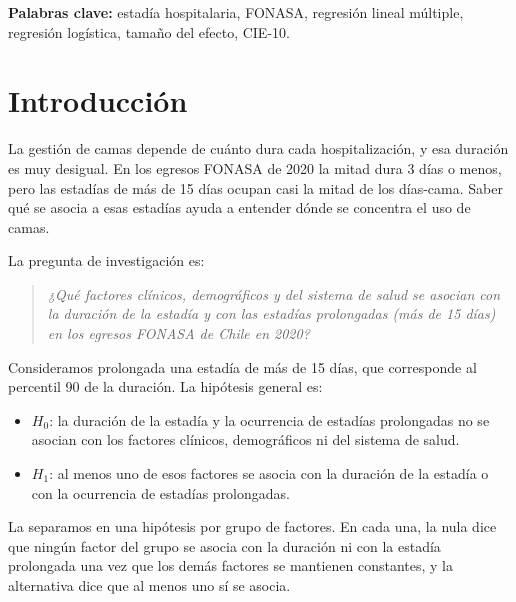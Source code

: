 \documentclass[10.5pt,a4paper,headings=small,abstract=false,bibliography=totoc,listof=totoc]{scrartcl}
\newcommand{\cie}{\mbox{CIE-10}}
\begin{document}
\vspace{0.4em}
{\small\color{gris}\textbf{Palabras clave:} estadía hospitalaria, FONASA, regresión lineal múltiple, regresión logística, tamaño del efecto, \cie.\par}

\clearpage
\tableofcontents
\vspace{1.2em}
\listoftables
\vspace{1.2em}
\listoffigures

\clearpage
{}

\section{Introducción}

La gestión de camas depende de cuánto dura cada hospitalización, y esa duración es muy desigual. En los egresos FONASA de 2020 la mitad dura 3 días o menos, pero las estadías de más de 15 días ocupan casi la mitad de los días-cama. Saber qué se asocia a esas estadías ayuda a entender dónde se concentra el uso de camas.

La pregunta de investigación es:

\begin{quote}
\emph{¿Qué factores clínicos, demográficos y del sistema de salud se asocian con la duración de la estadía y con las estadías prolongadas (más de 15 días) en los egresos FONASA de Chile en 2020?}
\end{quote}

Consideramos prolongada una estadía de más de 15 días, que corresponde al percentil 90 de la duración. La hipótesis general es:

\begin{itemize}\setlength\itemsep{0pt}
\item $H_0$: la duración de la estadía y la ocurrencia de estadías prolongadas no se asocian con los factores clínicos, demográficos ni del sistema de salud.
\item $H_1$: al menos uno de esos factores se asocia con la duración de la estadía o con la ocurrencia de estadías prolongadas.
\end{itemize}

La separamos en una hipótesis por grupo de factores. En cada una, la nula dice que ningún factor del grupo se asocia con la duración ni con la estadía prolongada una vez que los demás factores se mantienen constantes, y la alternativa dice que al menos uno sí se asocia.
\end{document}
